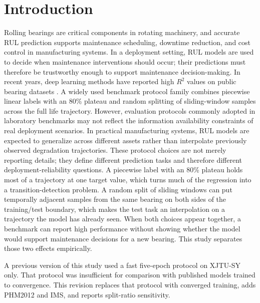 \documentclass[pdflatex,sn-mathphys-num]{sn-jnl}
\begin{document}
\section{Introduction}
Rolling bearings are critical components in rotating machinery, and accurate RUL prediction supports maintenance scheduling, downtime reduction, and cost control in manufacturing systems. \cite{lei2018machinery,zhao2019deep} In a deployment setting, RUL models are used to decide when maintenance interventions should occur; their predictions must therefore be trustworthy enough to support maintenance decision-making. In recent years, deep learning methods have reported high $R^2$ values on public bearing datasets \cite{rul_lstm_uq_2022,reg_lstm_2021,gru_tim_2021,transformer_tim_2023}. A widely used benchmark protocol family combines piecewise linear labels with an 80\% plateau and random splitting of sliding-window samples across the full life trajectory. However, evaluation protocols commonly adopted in laboratory benchmarks may not reflect the information availability constraints of real deployment scenarios.
In practical manufacturing systems, RUL models are expected to generalize across different assets rather than interpolate previously observed degradation trajectories. These protocol choices are not merely reporting details; they define different prediction tasks and therefore different deployment-reliability questions. A piecewise label with an 80\% plateau holds most of a trajectory at one target value, which turns much of the regression into a transition-detection problem. A random split of sliding windows can put temporally adjacent samples from the same bearing on both sides of the training/test boundary, which makes the test task an interpolation on a trajectory the model has already seen. When both choices appear together, a benchmark can report high performance without showing whether the model would support maintenance decisions for a new bearing. This study separates those two effects empirically.

A previous version of this study used a fast five-epoch protocol on XJTU-SY only. That protocol was insufficient for comparison with published models trained to convergence. This revision replaces that protocol with converged training, adds PHM2012 and IMS, and reports split-ratio sensitivity.
\end{document}
